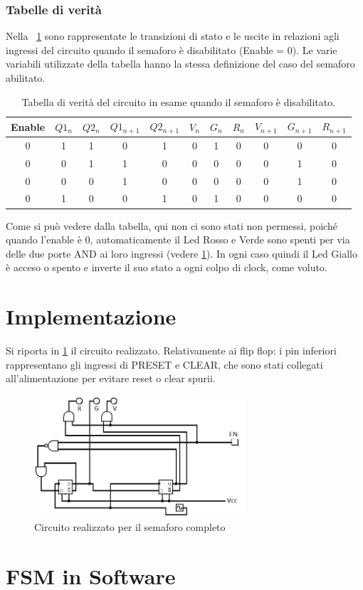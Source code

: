 \documentclass[a4paper,10pt]{article}
\begin{document}
\subsubsection{Tabelle di verità}

Nella \tablename{~\ref{tab:lampe}} sono rappresentate le transizioni di stato e le uscite in relazioni agli ingressi del circuito quando il semaforo è disabilitato (Enable = 0). Le varie variabili utilizzate della tabella hanno la stessa definizione del caso del semaforo abilitato.
 
 \begin{table}[H]
	\centering
	\begin{tabular}{c|cc|cc|ccc|ccc}
	\hline
	Enable & $Q1_n$ & $Q2_n$ & $Q1_{n+1}$ & $Q2_{n+1}$ & $V_n$ & $G_n$ & $R_n$ & $V_{n+1}$ & $G_{n+1}$ & $R_{n+1}$ \\
	\hline
	0 & 1 & 1 & 0 & 1 & 0 & 1 & 0 & 0 & 0 & 0 \\
	0 & 0 & 1 & 1 & 0 & 0 & 0 & 0 & 0 & 1 & 0 \\
	0 & 0 & 0 & 1 & 0 & 0 & 0 & 0 & 0 & 1 & 0 \\
	0 & 1 & 0 & 0 & 1 & 0 & 1 & 0 & 0 & 0 & 0 \\
	\hline
		\end{tabular}
	\caption{Tabella di verità del circuito in esame quando il semaforo è disabilitato.}
	\label{tab:lampe}
\end{table}

Come si può vedere dalla tabella, qui non ci sono stati non permessi, poiché quando l'enable è 0, automaticamente il Led Rosso e Verde sono spenti per via delle due porte AND ai loro ingressi (vedere \cref{fig:circuit}). In ogni caso quindi il Led Giallo è acceso o spento e inverte il suo stato a ogni colpo di clock, come voluto.


\section{Implementazione}

Si riporta in \cref{fig:circuit} il circuito realizzato.
Relativamente ai flip flop: i pin inferiori rappresentano gli ingressi di PRESET e CLEAR, che sono stati collegati all'alimentazione per evitare reset o clear spurii.

\begin{figure}[H]
	\centering
	\includegraphics[width=0.7\textwidth]{../grafici/circuito.png}
	\caption{Circuito realizzato per il semaforo completo}
	\label{fig:circuit}
\end{figure}

\section{FSM in Software}
\end{document}
